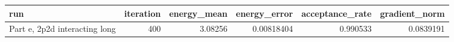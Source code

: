\begin{tabular}{lrrrrr}
\toprule
run & iteration & energy_mean & energy_error & acceptance_rate & gradient_norm \\
\midrule
Part e, 2p2d interacting long & 400 & 3.08256 & 0.00818404 & 0.990533 & 0.0839191 \\
\bottomrule
\end{tabular}
